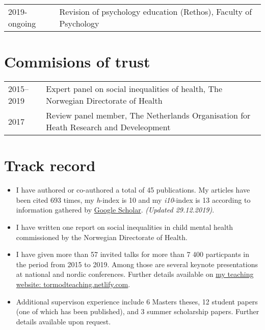 \documentclass[11pt,a4paper,a4paper]{article}
\providecommand{\tightlist}{%
  \setlength{\itemsep}{0pt}\setlength{\parskip}{0pt}}
\newcounter{papers}
\begin{document}
\begin{tabular}{ll}
  2019-ongoing & Revision of psychology education (Rethos), Faculty of Psychology \\ 
  \end{tabular}

\hypertarget{commisions-of-trust}{%
\section{Commisions of trust}\label{commisions-of-trust}}

\begin{tabular}{ll}
  2015--2019 & Expert panel on social inequalities of health, The Norwegian Directorate of Health \\ 
  2017 & Review panel member, The Netherlands Organisation for Heath Research and Develeopment \\ 
  \end{tabular}

\hypertarget{track-record}{%
\section{Track record}\label{track-record}}

\begin{itemize}
\tightlist
\item
  I have authored or co-authored a total of 45 publications. My articles have been cited 693 times, my \emph{h}-index is 10 and my \emph{i10}-index is 13 according to information gathered by \href{https://scholar.google.com/citations?user=TMC38ZgAAAAJ\&hl=en}{Google Scholar}. \emph{(Updated 29.12.2019)}.
\item
  I have written one report on social inequalities in child mental health commissioned by the Norwegian Directorate of Health.
\item
  I have given more than 57 invited talks for more than 7 400 particpants in the period from 2015 to 2019. Among those are several keynote presentations at national and nordic conferences. Further details available on \href{https://tormodteaching.netlify.com/appendd.html}{my teaching website: tormodteaching.netlify.com}.
\item
  Additional supervison experience include 6 Masters theses, 12 student papers (one of which has been published), and 3 summer scholarship papers. Further details available upon request.
\end{itemize}

\newpage
\end{document}
